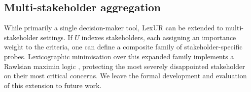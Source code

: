 \subsection{Multi-stakeholder aggregation}
While primarily a single decision-maker tool, LexUR can be extended to multi-stakeholder settings. If $U$ indexes stakeholders, each assigning an importance weight to the criteria, one can define a composite family of stakeholder-specific probes. Lexicographic minimisation over this expanded family implements a Rawlsian maximin logic \citep{rawls1971}, protecting the most severely disappointed stakeholder on their most critical concerns. We leave the formal development and evaluation of this extension to future work.
